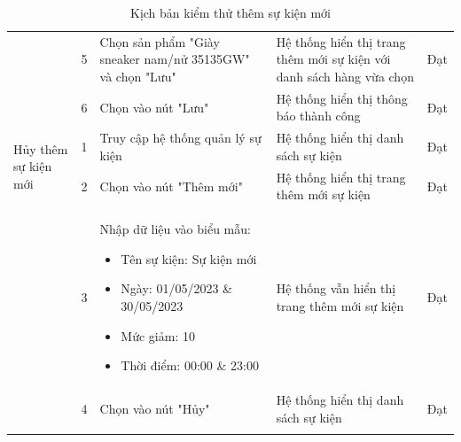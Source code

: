 {\begin{longtable}{| p{2.5cm}| p{1cm}| p{5.5cm}| p{4.5cm} | p{1.5cm} |}
        \cline{2-5}
                                                     & 5                                            & Chọn sản phẩm "Giày sneaker nam/nử 35135GW" và chọn "Lưu" & Hệ thống hiển thị trang thêm mới sự kiện với danh sách hàng vừa chọn & Đạt             \\
        \cline{2-5}
                                                     & 6                                            & Chọn vào nút "Lưu"                                        & Hệ thống hiển thị thông báo thành công                               & Đạt             \\
        \hline
        \multirow[t]{2}{2.5cm}{Hủy thêm sự kiện mới} & 1                                            & Truy cập hệ thống quản lý sự kiện                         & Hệ thống hiển thị danh sách sự kiện                                  & Đạt             \\
        \cline{2-5}
                                                     & 2                                            & Chọn vào nút "Thêm mới"                                   & Hệ thống hiển thị trang thêm mới sự kiện                             & Đạt             \\
        \cline{2-5}
                                                     & 3                                            & Nhập dữ liệu vào biểu mẫu:
        \begin{itemize}
            \item Tên sự kiện: Sự kiện mới
            \item Ngày: 01/05/2023 \& 30/05/2023
            \item Mức giảm: 10
            \item Thời điểm: 00:00 \& 23:00
        \end{itemize}         & Hệ thống vẫn hiển thị trang thêm mới sự kiện & Đạt                                                                                                                                                                       \\
        \cline{2-5}
                                                     & 4                                            & Chọn vào nút "Hủy"                                        & Hệ thống hiển thị danh sách sự kiện                                  & Đạt             \\
        \hline
        \caption{Kịch bản kiểm thử thêm sự kiện mới}
    \end{longtable}
}


